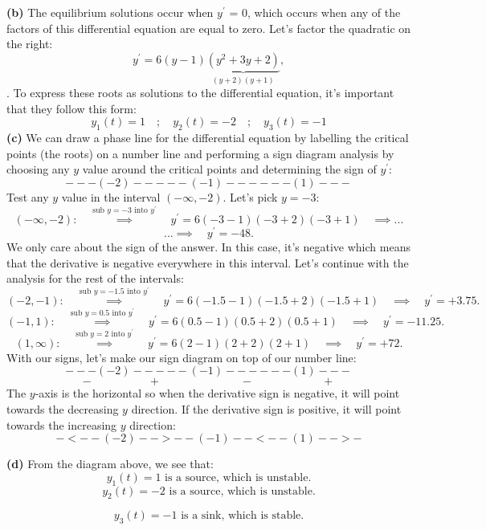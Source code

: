\documentclass[a4paper,12pt]{article} %
\begin{document}
\textbf{(b)} The equilibrium solutions occur when $y^{\prime}$ = 0, which occurs when any of the factors of this differential equation are equal to zero. Let's factor the quadratic on the right:
$$ y^{\prime} = 6(y-1)\underbrace{(y^2+3y+2)}_{(y + 2)(y + 1)}, $$
. To express these roots as solutions to the differential equation, it's important that they follow this form:
$$ \boxed{y_1(t) = 1 \quad;\quad y_2(t) = -2 \quad;\quad y_3(t) = -1}$$
\textbf{(c)} We can draw a phase line for the differential equation by labelling the critical points (the roots) on a number line and performing a sign diagram analysis by choosing any $y$ value around the critical points and determining the sign of $y^{\prime}$:\\
$$ ---(-2)-----(-1)------(1)--- $$
Test any $y$ value in the interval $(-\infty, -2)$. Let's pick $y=-3$:
$$ (-\infty, -2): \quad\overset{\text{sub }y=-3\text{ into }y^{\prime}}\implies \quad y^{\prime} = 6(-3-1)(-3 + 2)(-3+1) \quad\implies ... $$
$$ ...\implies \quad y^{\prime} = -48. $$
We only care about the sign of the answer. In this case, it's negative which means that the derivative is negative everywhere in this interval. Let's continue with the analysis for the rest of the intervals:
$$ (-2,-1): \quad\overset{\text{sub }y=-1.5\text{ into }y^{\prime}}\implies \quad y^{\prime} = 6(-1.5-1)(-1.5+2)(-1.5+1) \quad\implies \quad y^{\prime}=+3.75.$$
$$ (-1,1): \quad\overset{\text{sub }y=0.5\text{ into }y^{\prime}}\implies \quad y^{\prime} = 6(0.5-1)(0.5+2)(0.5+1) \quad\implies \quad y^{\prime} = -11.25.$$
$$ (1,\infty): \quad\overset{\text{sub }y=2\text{ into }y^{\prime}}\implies \quad y^{\prime} = 6(2-1)(2+2)(2+1) \quad\implies \quad y^{\prime} = +72. $$
With our signs, let's make our sign diagram on top of our number line:
$$ ---(-2)-----(-1)------(1)---  $$
$$ - \quad\quad\quad\quad\quad + \quad\quad\quad\quad\quad\quad\quad - \quad\quad\quad\quad\quad\quad + $$
The $y$-axis is the horizontal so when the derivative sign is negative, it will point towards the decreasing $y$ direction. If the derivative sign is positive, it will point towards the increasing $y$ direction:
$$ -<--(-2)-->--(-1)--<--(1)-->- $$
\pagebreak

\textbf{(d)} From the diagram above, we see that:
$$ \boxed{y_1(t) =1 \text{ is a source, which is unstable.}} $$
$$ \boxed{y_2(t) =-2 \text{ is a source, which is unstable.}} $$

$$\boxed{y_3(t) =-1 \text{ is a sink, which is stable.}} $$
\end{document}
